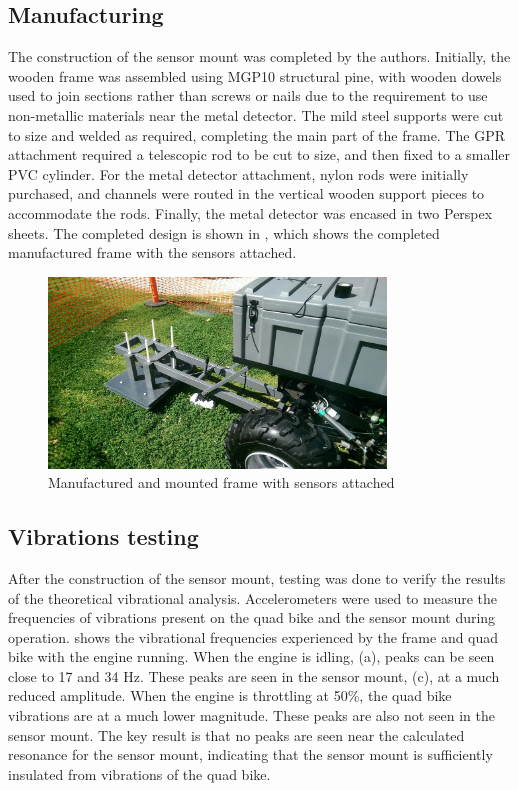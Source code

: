 \documentclass[main.tex]{subfiles}
\begin{document}
\subsection{Manufacturing}
The construction of the sensor mount was completed by the authors. Initially, the wooden frame was assembled using MGP10 structural pine, with wooden dowels used to join sections rather than screws or nails due to the requirement to use non-metallic materials near the metal detector. The mild steel supports were cut to size and welded as required, completing the main part of the frame. The GPR attachment required a telescopic rod to be cut to size, and then fixed to a smaller PVC cylinder. For the metal detector attachment, nylon rods were initially purchased, and channels were routed in the vertical wooden support pieces to accommodate the rods. Finally, the metal detector was encased in two Perspex sheets. The completed design is shown in , which shows the completed manufactured frame with the sensors attached. 
\begin{figure}[!ht]
\includegraphics[width=0.8\textwidth]{4-DetailedDesign/QuadBikeFinalFrame.jpg}
\centering
\caption{Manufactured and mounted frame with sensors attached} 
\end{figure}

\subsection{Vibrations testing}
After the construction of the sensor mount, testing was done to verify the results of the theoretical vibrational analysis. Accelerometers were used to measure the frequencies of vibrations present on the quad bike and the sensor mount during operation.  shows the vibrational frequencies experienced by the frame and quad bike with the engine running. When the engine is idling,  (a), peaks can be seen close to 17 and 34 Hz. These peaks are seen in the sensor mount,  (c), at a much reduced amplitude. When the engine is throttling at 50\%, the quad bike vibrations are at a much lower magnitude. These peaks are also not seen in the sensor mount. The key result is that no peaks are seen near the calculated resonance for the sensor mount, indicating that the sensor mount is sufficiently insulated from vibrations of the quad bike. 
\end{document}
